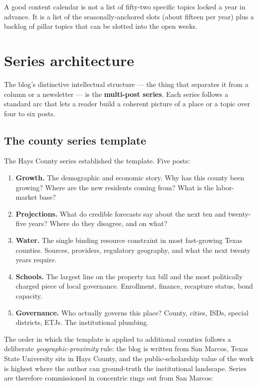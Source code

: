 \documentclass[11pt]{article}
\begin{document}
A good content calendar is not a list of fifty-two specific topics
locked a year in advance. It is a list of the seasonally-anchored
slots (about fifteen per year) plus a backlog of pillar topics that
can be slotted into the open weeks.

\section{Series architecture}

The blog's distinctive intellectual structure --- the thing that
separates it from a column or a newsletter --- is the
\textbf{multi-post series}. Each series follows a standard arc that
lets a reader build a coherent picture of a place or a topic over
four to six posts.

\subsection{The county series template}

The Hays County series established the template. Five posts:

\begin{enumerate}
\item \textbf{Growth.} The demographic and economic story. Why has
this county been growing? Where are the new residents coming from?
What is the labor-market base?
\item \textbf{Projections.} What do credible forecasts say about the
next ten and twenty-five years? Where do they disagree, and on what?
\item \textbf{Water.} The single binding resource constraint in
most fast-growing Texas counties. Sources, providers, regulatory
geography, and what the next twenty years require.
\item \textbf{Schools.} The largest line on the property tax bill
and the most politically charged piece of local governance.
Enrollment, finance, recapture status, bond capacity.
\item \textbf{Governance.} Who actually governs this place? County,
cities, ISDs, special districts, ETJs. The institutional plumbing.
\end{enumerate}

The order in which the template is applied to additional
counties follows a deliberate \emph{geographic-proximity} rule:
the blog is written from San Marcos, Texas State University sits
in Hays County, and the public-scholarship value of the work is
highest where the author can ground-truth the institutional
landscape. Series are therefore commissioned in concentric rings
out from San Marcos:
\end{document}
